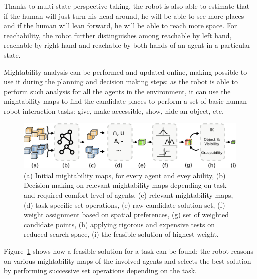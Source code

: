 \documentclass{svmult}
\begin{document}
Thanks to multi-state perspective taking, the robot is also able to estimate
that if the human will just turn his head around, he will be able to see more
places and if the human will lean forward, he will be able to reach more space.
For reachability, the robot further distinguishes among reachable by left hand,
reachable by right hand and reachable by both hands of an agent in a particular
state.  

Mightability analysis can be performed and updated online, making possible to
use it during the planning and decision making steps: as the robot is able to
perform such analysis for all the agents in the environment, it can use the
mightability maps to find the candidate places to perform a set of basic
human-robot interaction tasks: give, make accessible, show, hide an object,
etc. 

\begin{figure}
  \centering
  \includegraphics[width=\textwidth]{./figs/mightab-steps.pdf}

\caption {(a) Initial mightability maps, for every agent and evey ability, (b)
Decision making on relevant mightability maps depending on task and required
comfort level of agents, (c) relevant mightability maps, (d) task specific set
operations, (e) raw candidate solution set, (f) weight assignment based on
spatial preferences, (g) set of weighted candidate points, (h) applying
rigorous and expensive tests on reduced search space, (i) the feasible solution
of highest weight.}

  \label{fig|mightabilities-framework}
\end{figure}


Figure~\ref{fig|mightabilities-framework} shows how a feasible solution for a
task can be found: the robot reasons on various mightability maps of the
involved agents and selects the best solution by performing successive set
operations depending on the task.
\end{document}
